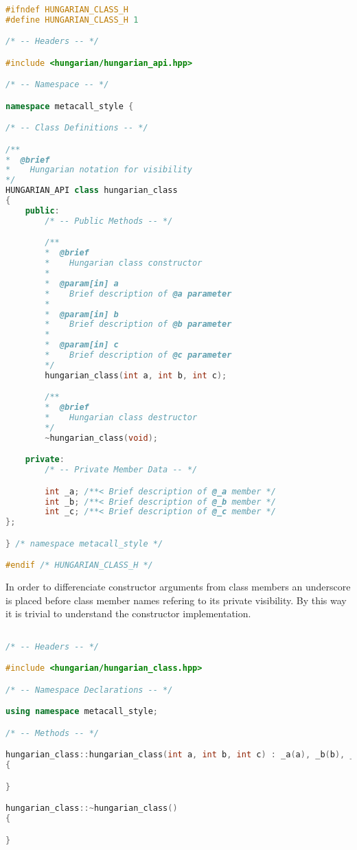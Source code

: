 \documentclass{article}
\begin{document}
% 

\begin{lstlisting}[language=C++]

#ifndef HUNGARIAN_CLASS_H
#define HUNGARIAN_CLASS_H 1

/* -- Headers -- */

#include <hungarian/hungarian_api.hpp>

/* -- Namespace -- */

namespace metacall_style {

/* -- Class Definitions -- */

/**
*  @brief
*    Hungarian notation for visibility
*/
HUNGARIAN_API class hungarian_class
{
	public:
		/* -- Public Methods -- */

		/**
		*  @brief
		*    Hungarian class constructor
		*
		*  @param[in] a
		*    Brief description of @a parameter
		*
		*  @param[in] b
		*    Brief description of @b parameter
		*
		*  @param[in] c
		*    Brief description of @c parameter
		*/
		hungarian_class(int a, int b, int c);

		/**
		*  @brief
		*    Hungarian class destructor
		*/
		~hungarian_class(void);

	private:
		/* -- Private Member Data -- */

		int _a;	/**< Brief description of @_a member */
		int _b;	/**< Brief description of @_b member */
		int _c;	/**< Brief description of @_c member */
};

} /* namespace metacall_style */

#endif /* HUNGARIAN_CLASS_H */

\end{lstlisting}

In order to differenciate constructor arguments from class members an underscore is placed before class
member names refering to its private visibility. By this way it is trivial to understand the constructor
implementation.


% 

\begin{lstlisting}[language=C++]

/* -- Headers -- */

#include <hungarian/hungarian_class.hpp>

/* -- Namespace Declarations -- */

using namespace metacall_style;

/* -- Methods -- */

hungarian_class::hungarian_class(int a, int b, int c) : _a(a), _b(b), _c(c)
{

}

hungarian_class::~hungarian_class()
{

}

\end{lstlisting}
\end{document}
